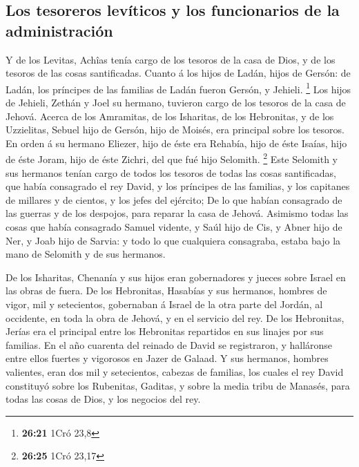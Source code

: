 \hypertarget{los-tesoreros-levuxedticos-y-los-funcionarios-de-la-administraciuxf3n}{%
\subsection{Los tesoreros levíticos y los funcionarios de la
administración}\label{los-tesoreros-levuxedticos-y-los-funcionarios-de-la-administraciuxf3n}}

 Y de los Levitas, Achîas tenía cargo de los tesoros de
la casa de Dios, y de los tesoros de las cosas santificadas.
 Cuanto á los hijos de Ladán, hijos de Gersón: de Ladán,
los príncipes de las familias de Ladán fueron Gersón, y Jehieli.
\footnote{\textbf{26:21} 1Cró 23,8}  Los hijos de
Jehieli, Zethán y Joel su hermano, tuvieron cargo de los tesoros de la
casa de Jehová.  Acerca de los Amramitas, de los
Isharitas, de los Hebronitas, y de los Uzzielitas, 
Sebuel hijo de Gersón, hijo de Moisés, era principal sobre los tesoros.
 En orden á su hermano Eliezer, hijo de éste era Rehabía,
hijo de éste Isaías, hijo de éste Joram, hijo de éste Zichri, del que
fué hijo Selomith. \footnote{\textbf{26:25} 1Cró 23,17} 
Este Selomith y sus hermanos tenían cargo de todos los tesoros de todas
las cosas santificadas, que había consagrado el rey David, y los
príncipes de las familias, y los capitanes de millares y de cientos, y
los jefes del ejército;  De lo que habían consagrado de
las guerras y de los despojos, para reparar la casa de Jehová.
 Asimismo todas las cosas que había consagrado Samuel
vidente, y Saúl hijo de Cis, y Abner hijo de Ner, y Joab hijo de Sarvia:
y todo lo que cualquiera consagraba, estaba bajo la mano de Selomith y
de sus hermanos.

 De los Isharitas, Chenanía y sus hijos eran gobernadores
y jueces sobre Israel en las obras de fuera.  De los
Hebronitas, Hasabías y sus hermanos, hombres de vigor, mil y
setecientos, gobernaban á Israel de la otra parte del Jordán, al
occidente, en toda la obra de Jehová, y en el servicio del rey.
 De los Hebronitas, Jerías era el principal entre los
Hebronitas repartidos en sus linajes por sus familias. En el año
cuarenta del reinado de David se registraron, y halláronse entre ellos
fuertes y vigorosos en Jazer de Galaad.  Y sus hermanos,
hombres valientes, eran dos mil y setecientos, cabezas de familias, los
cuales el rey David constituyó sobre los Rubenitas, Gaditas, y sobre la
media tribu de Manasés, para todas las cosas de Dios, y los negocios del
rey.

